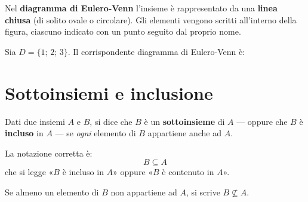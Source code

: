 \begin{regola}
Nel \textbf{diagramma di Eulero-Venn} l'insieme è rappresentato da una \textbf{linea chiusa} (di solito ovale o circolare). Gli elementi vengono scritti all'interno della figura, ciascuno indicato con un punto seguito dal proprio nome.
\end{regola}

\begin{esempio}
Sia $D = \{1;\, 2;\, 3\}$. Il corrispondente diagramma di Eulero-Venn è:

\begin{center}
\end{center}
\end{esempio}

\section{Sottoinsiemi e inclusione}

\begin{definizione}
Dati due insiemi $A$ e $B$, si dice che $B$ è un \textbf{sottoinsieme} di $A$ — oppure che $B$ è \textbf{incluso} in $A$ — se \emph{ogni} elemento di $B$ appartiene anche ad $A$.

La notazione corretta è:
\[
  B \subseteq A
\]
che si legge «$B$ è incluso in $A$» oppure «$B$ è contenuto in $A$».

Se almeno un elemento di $B$ non appartiene ad $A$, si scrive $B \not\subseteq A$.
\end{definizione}

